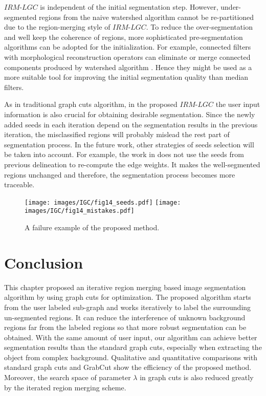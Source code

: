 $IRM$-$LGC$ is independent of the initial segmentation step.
However, under-segmented regions from the naive watershed algorithm
cannot be re-partitioned due to the region-merging style of
$IRM$-$LGC$. To reduce the over-segmentation and well keep the
coherence of regions, more sophisticated pre-segmentation algorithms
can be adopted for the initialization. For example, connected
filters with morphological reconstruction operators can eliminate or
merge connected components produced by watershed algorithm
\cite{R3}.  Hence they might be used as a more suitable tool for
improving the initial segmentation quality than median filters.

As in traditional graph cuts algorithm, in the proposed $IRM$-$LGC$
the user input information is also crucial for obtaining desirable
segmentation. Since the newly added seeds in each iteration depend
on the segmentation results in the previous iteration, the
misclassified regions will probably mislead the rest part of
segmentation process. In the future work, other strategies of seeds
selection will be taken into account. For example, the work in
\cite{R1} does not use the seeds from previous delineation to
re-compute the edge weights. It makes the well-segmented regions
unchanged and therefore, the segmentation process becomes more
traceable.

 \begin{figure}[htp]
        \centering
        {\label{fig:14:pixel1}\texttt{[image: images/IGC/fig14\_seeds.pdf]}}
        {\label{fig:14:pixel2}\texttt{[image: images/IGC/fig14\_mistakes.pdf]}}
        \caption{A failure example of the proposed method.}
        \label{fig:mistake}
        \end{figure}

\section{Conclusion}
This chapter proposed an iterative region merging based image segmentation algorithm by using graph cuts for optimization. The proposed algorithm starts from the user labeled sub-graph and works iteratively to label the surrounding un-segmented regions. It can reduce the interference of unknown background regions far from the labeled regions so that more robust segmentation can be obtained. With the same amount of user input, our algorithm can achieve better segmentation results than the standard graph cuts, especially when extracting the object from complex background. Qualitative and quantitative comparisons with standard graph cuts and GrabCut show the efficiency of the proposed method. Moreover, the search space of parameter $\lambda$ in graph cuts is also reduced greatly by the iterated region merging scheme. 